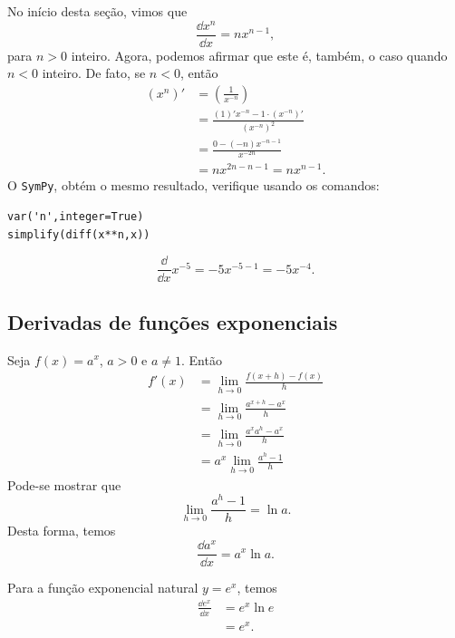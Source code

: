 \begin{obs}
  No início desta seção, vimos que
  \begin{equation}
    \frac{\dd x^n}{\dd x} = nx^{n-1},
  \end{equation}
  para $n>0$ inteiro. Agora, podemos afirmar que este é, também, o caso quando $n<0$ inteiro. De fato, se $n < 0$, então
  \begin{align}
    (x^n)' &= \left(\frac{1}{x^{-n}}\right)\\
           &= \frac{(1)'x^{-n}-1\cdot\left(x^{-n}\right)'}{\left(x^{-n}\right)^2}\\
           &= \frac{0-(-n)x^{-n-1}}{x^{-2n}}\\
           &= nx^{2n-n-1} = nx^{n-1}.
  \end{align}
  \ifispython
  O \verb+SymPy+, obtém o mesmo resultado, verifique usando os comandos:
\begin{verbatim}
var('n',integer=True)
simplify(diff(x**n,x))
\end{verbatim}
  \fi
\end{obs}

\begin{ex}
  \begin{equation}
    \frac{\dd}{\dd x}x^{-5} = -5x^{-5-1} = -5x^{-4}.
  \end{equation}
\end{ex}


\subsection{Derivadas de funções exponenciais}

Seja $f(x) = a^x$, $a>0$ e $a\neq 1$. Então
\begin{align}
  f'(x) &= \lim_{h\to 0} \frac{f(x+h)-f(x)}{h}\\
        &= \lim_{h\to 0} \frac{a^{x+h}-a^x}{h} \\
        &= \lim_{h\to 0} \frac{a^xa^h-a^x}{h} \\
        &= a^x \lim_{h\to 0} \frac{a^h-1}{h}
\end{align}
Pode-se mostrar que
\begin{equation}
  \lim_{h\to 0} \frac{a^h-1}{h} = \ln a.
\end{equation}
Desta forma, temos
\begin{equation}
  \frac{\dd a^x}{\dd x} = a^x\ln a.
\end{equation}

Para a função exponencial natural $y = e^x$, temos
\begin{align}
  \frac{\dd e^x}{\dd x} &= e^x\ln e\\
                        &= e^x.
\end{align}


